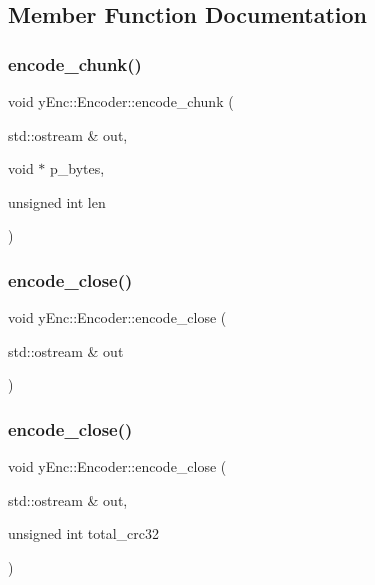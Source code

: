 \subsection{Member Function Documentation}
\hypertarget{classy_enc_1_1_encoder_aeb909154ff90f955861d83aadbefa94e}{}\label{classy_enc_1_1_encoder_aeb909154ff90f955861d83aadbefa94e} 
\subsubsection{\texorpdfstring{encode\+\_\+chunk()}{encode\_chunk()}}
{\footnotesize\ttfamily void y\+Enc\+::\+Encoder\+::encode\+\_\+chunk (\begin{DoxyParamCaption}\item[{std\+::ostream \&}]{out,  }\item[{void $\ast$}]{p\+\_\+bytes,  }\item[{unsigned int}]{len }\end{DoxyParamCaption})}

\hypertarget{classy_enc_1_1_encoder_ad8821346bf122c744cf813bc1bda519a}{}\label{classy_enc_1_1_encoder_ad8821346bf122c744cf813bc1bda519a} 
\subsubsection{\texorpdfstring{encode\+\_\+close()}{encode\_close()}\hspace{0.1cm}{\footnotesize\ttfamily [1/2]}}
{\footnotesize\ttfamily void y\+Enc\+::\+Encoder\+::encode\+\_\+close (\begin{DoxyParamCaption}\item[{std\+::ostream \&}]{out }\end{DoxyParamCaption})}

\hypertarget{classy_enc_1_1_encoder_a270b6e16ca932db46cc81a829d94198e}{}\label{classy_enc_1_1_encoder_a270b6e16ca932db46cc81a829d94198e} 
\subsubsection{\texorpdfstring{encode\+\_\+close()}{encode\_close()}\hspace{0.1cm}{\footnotesize\ttfamily [2/2]}}
{\footnotesize\ttfamily void y\+Enc\+::\+Encoder\+::encode\+\_\+close (\begin{DoxyParamCaption}\item[{std\+::ostream \&}]{out,  }\item[{unsigned int}]{total\+\_\+crc32 }\end{DoxyParamCaption})}

